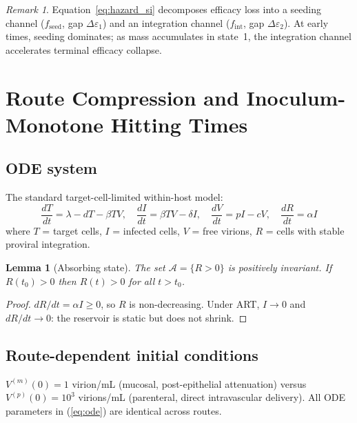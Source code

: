 \documentclass[11pt]{article}
\newtheorem{lemma}{Lemma}[section]
\theoremstyle{definition}
\theoremstyle{remark}
\newtheorem*{remark}{Remark}
\begin{document}
\begin{remark}
Equation~\ref{eq:hazard_si} decomposes efficacy loss into a seeding channel ($f_{\text{seed}}$, gap $\Delta\varepsilon_{1}$) and an integration channel ($f_{\text{int}}$, gap $\Delta\varepsilon_{2}$). At early times, seeding dominates; as mass accumulates in state~1, the integration channel accelerates terminal efficacy collapse.
\end{remark}

\section{Route Compression and Inoculum-Monotone Hitting Times}

\subsection{ODE system}

The standard target-cell-limited within-host model:
\begin{equation}
\frac{dT}{dt} = \lambda - dT - \beta TV, \quad
\frac{dI}{dt} = \beta TV - \delta I, \quad
\frac{dV}{dt} = pI - cV, \quad
\frac{dR}{dt} = \alpha I
\label{eq:ode}
\end{equation}
where $T$ = target cells, $I$ = infected cells, $V$ = free virions, $R$ = cells with stable proviral integration.

\begin{lemma}[Absorbing state]\label{lem:absorb}
The set $\mathcal{A} = \{R > 0\}$ is positively invariant. If $R(t_{0}) > 0$ then $R(t) > 0$ for all $t > t_{0}$.
\end{lemma}

\begin{proof}
$dR/dt = \alpha I \geq 0$, so $R$ is non-decreasing. Under ART, $I \to 0$ and $dR/dt \to 0$: the reservoir is static but does not shrink.
\end{proof}

\subsection{Route-dependent initial conditions}

$V^{(m)}(0) = 1$ virion/mL (mucosal, post-epithelial attenuation) versus $V^{(p)}(0) = 10^{3}$ virions/mL (parenteral, direct intravascular delivery). All ODE parameters in (\ref{eq:ode}) are identical across routes.
\end{document}
